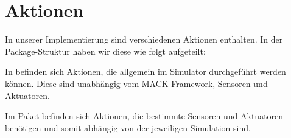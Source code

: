 \section{Aktionen}\label{subsec:real_actions}
In unserer Implementierung sind verschiedenen Aktionen enthalten. In der Package-Struktur haben wir diese wie folgt aufgeteilt:

In  befinden sich Aktionen, die allgemein im Simulator durchgeführt werden können. Diese sind unabhängig vom MACK-Framework, Sensoren und Aktuatoren.

Im Paket  befinden sich Aktionen, die bestimmte Sensoren und Aktuatoren benötigen und somit abhängig von der jeweiligen Simulation sind.

